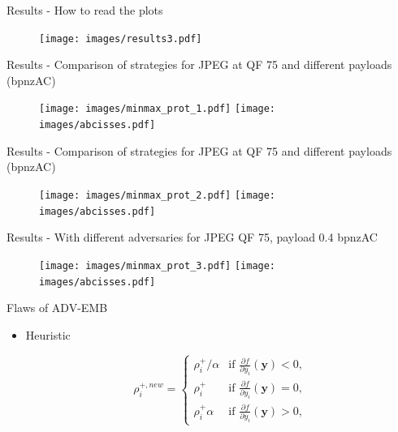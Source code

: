 \documentclass[10pt]{beamer}
\begin{document}







\begin{frame}{Results - How to read the plots }
    \begin{figure}
        \texttt{[image: images/results3.pdf]}
    \end{figure}
\end{frame}


\begin{frame}{Results - Comparison of strategies for JPEG at QF 75 and different payloads (bpnzAC)}
    \begin{figure}
        \texttt{[image: images/minmax\_prot\_1.pdf]}
        \texttt{[image: images/abcisses.pdf]}
    \end{figure}
\end{frame}

\begin{frame}{Results - Comparison of strategies for JPEG at QF 75 and different payloads (bpnzAC)}
    \begin{figure}
        \texttt{[image: images/minmax\_prot\_2.pdf]}
        \texttt{[image: images/abcisses.pdf]}
    \end{figure}
\end{frame}

\begin{frame}{Results - With different adversaries for JPEG QF 75, payload 0.4 bpnzAC}
    \begin{figure}
        \texttt{[image: images/minmax\_prot\_3.pdf]}
        \texttt{[image: images/abcisses.pdf]}
    \end{figure}
\end{frame}


\begin{frame}{Flaws of ADV-EMB}

    \begin{itemize}

        \item Heuristic
        
            \begin{equation}
                \rho_{i}^{+, new} = 
                \left\{
                    \begin{array}{ll}
                        \rho_{i}^+/\alpha & \mbox{if } \frac{\partial f}{\partial y_{i}}\left(\mathbf{y}\right) < 0, \\
                        \rho_{i}^+ & \mbox{if } \frac{\partial f}{\partial y_{i}}\left(\mathbf{y}\right) = 0, \\
                        \rho_{i}^+ \alpha & \mbox{if } \frac{\partial f}{\partial y_{i}}\left(\mathbf{y}\right) > 0,
                    \end{array}
                \right.
            \end{equation}

    \end{itemize}
    
\end{frame}
\end{document}
